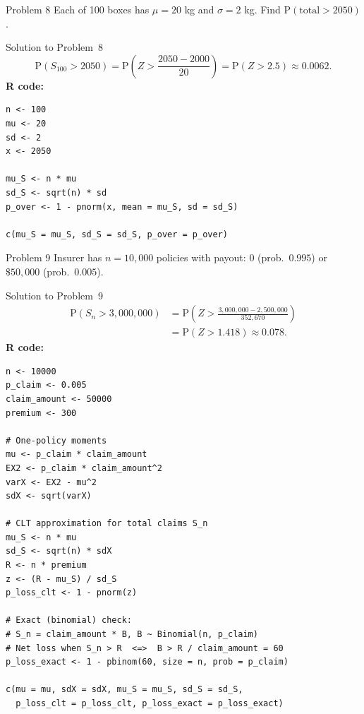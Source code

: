 \documentclass[12pt,a4paper]{article}
\renewcommand{\P}{\mathrm{P}}
\begin{document}
\vspace{6pt}

\begin{problembox}{Problem 8}
Each of 100 boxes has $\mu=20$ kg and $\sigma=2$ kg.
Find $\P(\text{total}>2050)$.
\end{problembox}

\begin{solutionbox}{Solution to Problem~8}
\[
\P(S_{100}>2050)=\P\!\left(Z>\frac{2050-2000}{20}\right)=\P(Z>2.5)\approx0.0062.
\]
\textbf{R code:}
\begin{lstlisting}[style=rcode]
n <- 100
mu <- 20
sd <- 2
x <- 2050

mu_S <- n * mu
sd_S <- sqrt(n) * sd
p_over <- 1 - pnorm(x, mean = mu_S, sd = sd_S)

c(mu_S = mu_S, sd_S = sd_S, p_over = p_over)
\end{lstlisting}
\end{solutionbox}

\vspace{6pt}

\begin{problembox}{Problem 9}
Insurer has $n=10{,}000$ policies with payout:
$0$ (prob.\ $0.995$) or $\$50{,}000$ (prob.\ $0.005$).
\end{problembox}

\begin{solutionbox}{Solution to Problem~9}
\[
\begin{aligned}
\P(S_n>3{,}000{,}000)
&=\P\!\left(Z>\frac{3{,}000{,}000-2{,}500{,}000}{352{,}670}\right)\\
&=\P(Z>1.418)\approx0.078.
\end{aligned}
\]
\textbf{R code:}
\begin{lstlisting}[style=rcode]
n <- 10000
p_claim <- 0.005
claim_amount <- 50000
premium <- 300

# One-policy moments
mu <- p_claim * claim_amount
EX2 <- p_claim * claim_amount^2
varX <- EX2 - mu^2
sdX <- sqrt(varX)

# CLT approximation for total claims S_n
mu_S <- n * mu
sd_S <- sqrt(n) * sdX
R <- n * premium
z <- (R - mu_S) / sd_S
p_loss_clt <- 1 - pnorm(z)

# Exact (binomial) check:
# S_n = claim_amount * B, B ~ Binomial(n, p_claim)
# Net loss when S_n > R  <=>  B > R / claim_amount = 60
p_loss_exact <- 1 - pbinom(60, size = n, prob = p_claim)

c(mu = mu, sdX = sdX, mu_S = mu_S, sd_S = sd_S,
  p_loss_clt = p_loss_clt, p_loss_exact = p_loss_exact)
\end{lstlisting}
\end{solutionbox}
\end{document}

